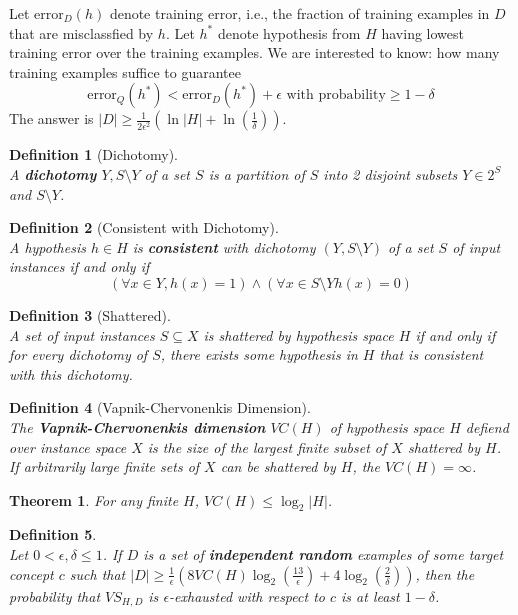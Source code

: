 \documentclass[12pt]{article}
\newtheorem{definition}{Definition}[section]
\newtheorem{theorem}{Theorem}[section]
\theoremstyle{definition}
\begin{document}
Let $\text{error}_D(h)$ denote training error, i.e., the fraction of training examples in $D$ that are misclassfied by $h$. Let $h^\ast$ denote hypothesis from $H$ having lowest training error over the training examples. We are interested to know: how many training examples suffice to guarantee
\[
\text{error}_Q(h^\ast)<\text{error}_D(h^\ast)+\epsilon\text{ with probability}\geq 1-\delta
\]
The answer is $|D|\geq \frac{1}{2\epsilon^2}(\ln |H| + \ln(\frac{1}{\delta}))$.
\begin{definition}[Dichotomy]
\hfill\\\normalfont A \textbf{dichotomy} $Y, S\setminus Y$ of a set $S$ is a partition of $S$ into 2 disjoint subsets $Y\in 2^S$ and $S\setminus Y$.
\end{definition}
\begin{definition}[Consistent with Dichotomy]
\hfill\\\normalfont A hypothesis $h\in H$ is \textbf{consistent} with dichotomy $(Y, S\setminus Y)$ of a set $S$ of input instances if and only if
\[
(\forall x\in Y,h(x)=1)\land (\forall x\in S\setminus Y h(x)=0)
\]
\end{definition}
\begin{definition}[Shattered]
\hfill\\\normalfont A set of input instances $S\subseteq X$ is shattered by hypothesis space $H$ \textit{if and only if} for \textit{every} dichotomy of $S$, there exists \textit{some hypothesis} in $H$ that is consistent with this dichotomy.
\end{definition}
\begin{definition}[Vapnik-Chervonenkis Dimension]
\hfill\\\normalfont The \textbf{Vapnik-Chervonenkis dimension} $VC(H)$ of hypothesis space $H$ defiend over instance space $X$ is the size of the largest finite subset of $X$ shattered by $H$. If arbitrarily large finite sets of $X$ can be shattered by $H$, the $VC(H)=\infty$.
\end{definition}
\begin{theorem}\normalfont For any finite $H$, $VC(H)\leq \log_2|H|$.\end{theorem}
\begin{definition}\hfill\\\normalfont Let $0<\epsilon, \delta\leq 1$. If $D$ is a set of \textbf{independent random} examples of some target concept $c$ such that $|D|\geq \frac{1}{\epsilon}(8VC(H)\log_2(\frac{13}{\epsilon})+4\log_2(\frac{2}{\delta}))$, then the probability that $VS_{H, D}$ is $\epsilon$-exhausted with respect to $c$ is at least $1-\delta$.
\end{definition}
\end{document}
